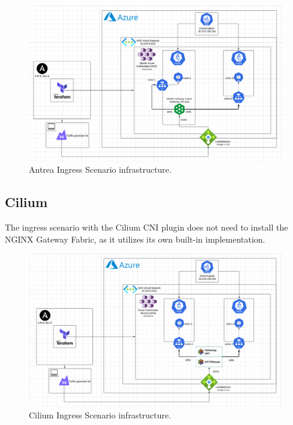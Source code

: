 \begin{figure}[tbh]
  \centering
  \includegraphics[width=1\columnwidth]{images/antrea_cloud_traffic_splitting.png}
  \caption{Antrea Ingress Scenario infrastructure.}
  \label{fig:antreaIngressScenarioArch}
\end{figure}

\subsection{Cilium}
\label{sec:ciliumIngressImpl}

The ingress scenario with the Cilium CNI plugin does not need to install the NGINX Gateway Fabric, as it utilizes its own built-in implementation.



\begin{figure}[H]
  \centering
  \includegraphics[width=1\columnwidth]{images/cilium_cloud_traffic_splitting.png}
  \caption{Cilium Ingress Scenario infrastructure.}
  \label{fig:ciliumIngressScenarioArch}
\end{figure}

